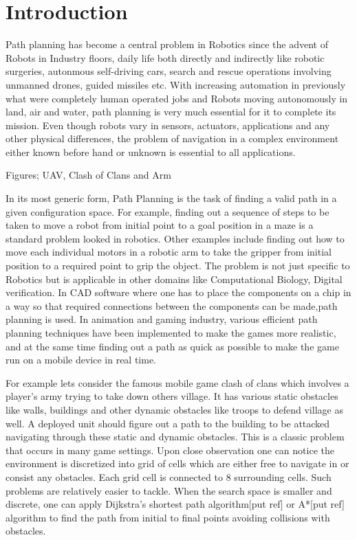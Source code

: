 \documentclass[MTech]{iitmdiss}
\begin{document}
\chapter{Introduction}
Path planning has become a central problem in Robotics since the advent of Robots in Industry floors, daily life both directly and indirectly like robotic surgeries, autonmous self-driving cars, search and rescue operations involving unmanned drones, guided missiles etc. With increasing automation in previously what were completely human operated jobs and Robots moving autonomously in land, air and water, path planning is very much essential for it to complete its mission. Even though robots vary in sensors, actuators, applications and any other physical differences, the problem of navigation in a complex environment either known before hand or unknown is essential to all applications. 

Figures; UAV,  Clash of Clans and Arm


 In its most generic form, Path Planning is the task of finding a valid path in a given configuration space. For example, finding out a sequence of steps to be taken to move a robot from initial point to a goal position in a maze is a standard problem looked in robotics. Other examples include finding out how to move each individual motors in a robotic arm to take the gripper from initial position to a required point to grip the object. The problem is not just specific to Robotics but is applicable in other domains like Computational Biology, Digital verification. In CAD software where one has to place the components on a chip in a way so that required connections between the components can be made,path planning is used. In animation and gaming industry, various efficient path planning techniques have been implemented to make the games more realistic, and at the same time finding out a path as quick as possible to make the game run on a mobile device in real time.
 
 For example lets consider the famous mobile game clash of clans which involves a player’s army trying to take down others village. It has various static obstacles like walls, buildings and other dynamic obstacles like troops to defend village as well. A deployed unit should figure out a path to the building to be attacked navigating through these static and dynamic obstacles. This is a classic problem that occurs in many game settings. Upon close observation one can notice the environment is discretized into grid of cells which are either free to navigate in or consist any obstacles. Each grid cell is connected to 8 surrounding cells. Such problems are relatively easier to tackle. When the search space is smaller and discrete, one can apply Dijkstra’s shortest path algorithm[put ref] or A*[put ref] algorithm to find the path from initial to final points avoiding collisions with obstacles. 
 
\end{document}
